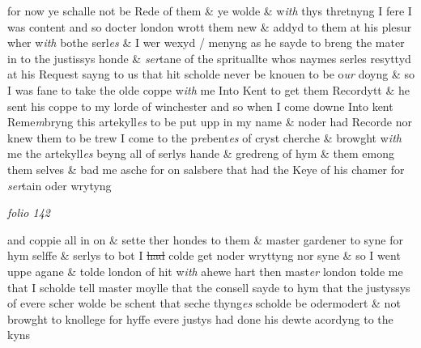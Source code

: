 \documentclass[12pt, a4paper]{book}
\begin{document}
 for now ye schalle not be Rede of them \& ye wolde \& w\textit{ith} thys thretnyng I fere
            				I was content and so docter london wrott them new \& addyd to them at his
            				 plesur wher w\textit{ith }bothe serl\textit{es} \& I wer wexyd / menyng as he sayde to breng
  the mater in to the justissys honde \& \textit{ser}tane of the sprituallte whos naymes
 serles resyttyd at his Request sayng to us that hit scholde never be knouen
 to be o\textit{ur} doyng \& so I was fane to take the olde coppe w\textit{ith} me Into Kent
            				to get them Recordytt \& he sent his coppe to my lorde of winchester
  and so when I come downe Into kent Reme\textit{m}bryng this artekyll\textit{es} to be put
 upp in my name \& noder had Recorde nor knew them to be trew I
 come to the p\textit{re}bent\textit{es} of cryst cherche \& browght w\textit{ith} me the artekyll\textit{es} beyng
            				all of serlys hande \& gredreng of hym \& them emong them selves \& bad
  me asche for on salsbere that had the Keye of his chamer for \textit{ser}tain oder wrytyng

\dotfill
					

\textit{folio 142}


 	
 		
				\marginpar[\vspace{0.5cm}{\textcolor{Gray}{n}}]{}
			
 		
				\marginpar[\vspace{0.5cm}{\textcolor{Gray}{Moyle}}]{}
			
		
		\ifthenelse{\isodd{\thepage}}
		{\reversemarginpar}
		{\normalmarginpar}
		and coppie all in on \& sette ther hondes to them \& master gardener to syne for
		 	 hym selffe \& serlys to bot I \sout{had}  colde get
			 noder wryttyng nor syne \& so I went uppe agane
			\& tolde london of hit w\textit{ith} ahewe hart then mast\textit{er} london tolde me that I scholde
			tell master moylle that the consell sayde to hym that the justyssys of evere
		 scher wolde be schent that seche thyng\textit{es} scholde be odermodert \& not browght
			to knollege for hyffe evere justys had done his dewte acordyng to the kyns
 	
 		
			
 		
				\marginpar[\vspace{0.5cm}{\textcolor{Gray}{Moyle}}]{}
			
\end{document}
